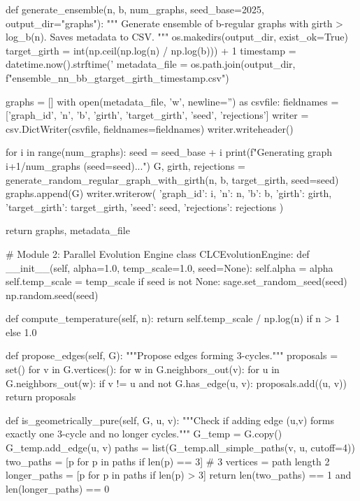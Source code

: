 \documentclass[11pt, a4paper]{article}
\begin{document}
def generate_ensemble(n, b, num_graphs, seed_base=2025, output_dir="graphs"):
    """
    Generate ensemble of b-regular graphs with girth > log_b(n).
    Saves metadata to CSV.
    """
    os.makedirs(output_dir, exist_ok=True)
    target_girth = int(np.ceil(np.log(n) / np.log(b))) + 1
    timestamp = datetime.now().strftime('%
    metadata_file = os.path.join(output_dir, f"ensemble_n{n}_b{b}_g{target_girth}_{timestamp}.csv")
    
    graphs = []
    with open(metadata_file, 'w', newline='') as csvfile:
        fieldnames = ['graph_id', 'n', 'b', 'girth', 'target_girth', 'seed', 'rejections']
        writer = csv.DictWriter(csvfile, fieldnames=fieldnames)
        writer.writeheader()
        
        for i in range(num_graphs):
            seed = seed_base + i
            print(f"Generating graph {i+1}/{num_graphs} (seed={seed})...")
            G, girth, rejections = generate_random_regular_graph_with_girth(n, b, target_girth, seed=seed)
            graphs.append(G)
            writer.writerow({
                'graph_id': i, 'n': n, 'b': b, 'girth': girth,
                'target_girth': target_girth, 'seed': seed, 'rejections': rejections
            })
    
    return graphs, metadata_file

# Module 2: Parallel Evolution Engine
class CLCEvolutionEngine:
    def __init__(self, alpha=1.0, temp_scale=1.0, seed=None):
        self.alpha = alpha
        self.temp_scale = temp_scale
        if seed is not None:
            sage.set_random_seed(seed)
            np.random.seed(seed)
    
    def compute_temperature(self, n):
        return self.temp_scale / np.log(n) if n > 1 else 1.0
    
    def propose_edges(self, G):
        """Propose edges forming 3-cycles."""
        proposals = set()
        for v in G.vertices():
            for w in G.neighbors_out(v):
                for u in G.neighbors_out(w):
                    if v != u and not G.has_edge(u, v):
                        proposals.add((u, v))
        return proposals
    
    def is_geometrically_pure(self, G, u, v):
        """Check if adding edge (u,v) forms exactly one 3-cycle and no longer cycles."""
        G_temp = G.copy()
        G_temp.add_edge(u, v)
        paths = list(G_temp.all_simple_paths(v, u, cutoff=4))
        two_paths = [p for p in paths if len(p) == 3]  # 3 vertices = path length 2
        longer_paths = [p for p in paths if len(p) > 3]
        return len(two_paths) == 1 and len(longer_paths) == 0
    
\end{document}
